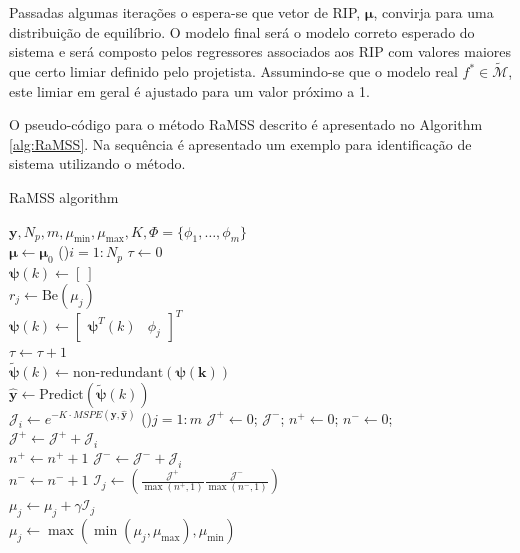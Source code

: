 Passadas algumas iterações o espera-se que vetor de RIP, $\bm{\mu}$, convirja para uma distribuição de equilíbrio. O modelo final será o modelo correto esperado do sistema e será composto pelos regressores associados aos RIP com valores maiores que certo limiar definido pelo projetista. Assumindo-se que o modelo real $f^* \in \tilde{\mathscr{M}}$, este limiar em geral é ajustado para um valor próximo a 1.

O pseudo-código para o método RaMSS descrito é apresentado no Algorithm \ref{alg:RaMSS}. Na sequência é apresentado  um exemplo para identificação de sistema utilizando o  método.

\begin{algorithm}[H]
  \caption{RaMSS algorithm}\label{alg:RaMSS}
  $\bm{y},N_p,m,\mu_{\min},\mu_{\max},K,\Phi=\{\phi_{1},\dots,\phi_{m}\}$ \\
   {
     $ \bm{\mu} \gets \bm{\mu}_0$
     \For(){$i=1:N_p$}
      {
         $\tau \gets 0$ \\
         $\bm{\psi}(k) \gets [\ ]$  \\
         {
           $r_j \gets \text{Be}(\mu_j)$ \\
            {
            $\bm{\psi}(k) \gets \begin{bmatrix} \bm{\psi}^T(k) & \phi_j \end{bmatrix}^T $ \\
            $\tau \gets \tau + 1$ \\
            }
         }
         {
           $\tilde{\bm{\psi}}(k) \gets \text{non-redundant}(\bm{\psi(k)})$ \\
         }
         $\hat{\bm{y}} \gets \text{Predict}(\tilde{\bm{\psi}}(k))$ \\
         $\mathcal{J}_i \gets e^{-K\cdot MSPE(\bm{y},\bm{\hat{y}})} $
      }
      \For(){$j=1:m$}
      {
         $\mathcal{J}^{+} \gets 0$; $ \mathcal{J}^{-}$; $n^{+} \gets 0$; $n^{-} \gets 0$; \\
         {
            {
               $\mathcal{J}^{+} \gets \mathcal{J}^{+} + \mathcal{J}_i$ \\
               $n^{+} \gets n^{+} + 1$
            } \Else
            {
               $\mathcal{J}^{-} \gets \mathcal{J}^{-} + \mathcal{J}_i$ \\
               $n^{-} \gets n^{-} + 1$
            }
            $\mathcal{I}_j \gets \left( \frac{\mathcal{J}^{+}}{\max(n^+,1)} \frac{\mathcal{J}^{-}}{\max(n^-,1)} \right) $ \\
         $\mu_j \gets \mu_j + \gamma \mathcal{I}_j$ \\
         $\mu_j \gets \max \left( \min(\mu_j, \mu_{\max}), \mu_{\min} \right) $ \\
         }
      }
   }
\end{algorithm}%

